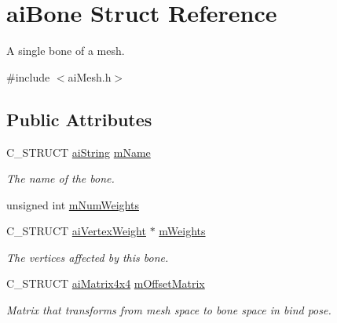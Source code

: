 \hypertarget{structai_bone}{\section{ai\-Bone Struct Reference}
\label{structai_bone}
}


A single bone of a mesh.  




{\ttfamily \#include $<$ai\-Mesh.\-h$>$}

\subsection*{Public Attributes}
\begin{DoxyCompactItemize}
\item 
\hypertarget{structai_bone_acfb9bfd2a2c6302181d7c3cc1bb8bbf0}{C\-\_\-\-S\-T\-R\-U\-C\-T \hyperlink{structai_string}{ai\-String} \hyperlink{structai_bone_acfb9bfd2a2c6302181d7c3cc1bb8bbf0}{m\-Name}}\label{structai_bone_acfb9bfd2a2c6302181d7c3cc1bb8bbf0}

\begin{DoxyCompactList}\small\item\em The name of the bone. \end{DoxyCompactList}\item 
unsigned int \hyperlink{structai_bone_a87a79d42a0132753aac66397ad6f9b71}{m\-Num\-Weights}
\item 
\hypertarget{structai_bone_ade36319714b58c03ad46aae30a2724a4}{C\-\_\-\-S\-T\-R\-U\-C\-T \hyperlink{structai_vertex_weight}{ai\-Vertex\-Weight} $\ast$ \hyperlink{structai_bone_ade36319714b58c03ad46aae30a2724a4}{m\-Weights}}\label{structai_bone_ade36319714b58c03ad46aae30a2724a4}

\begin{DoxyCompactList}\small\item\em The vertices affected by this bone. \end{DoxyCompactList}\item 
\hypertarget{structai_bone_a1dd6c4f24a1384c05da281692be3e78d}{C\-\_\-\-S\-T\-R\-U\-C\-T \hyperlink{structai_matrix4x4}{ai\-Matrix4x4} \hyperlink{structai_bone_a1dd6c4f24a1384c05da281692be3e78d}{m\-Offset\-Matrix}}\label{structai_bone_a1dd6c4f24a1384c05da281692be3e78d}

\begin{DoxyCompactList}\small\item\em Matrix that transforms from mesh space to bone space in bind pose. \end{DoxyCompactList}\end{DoxyCompactItemize}


